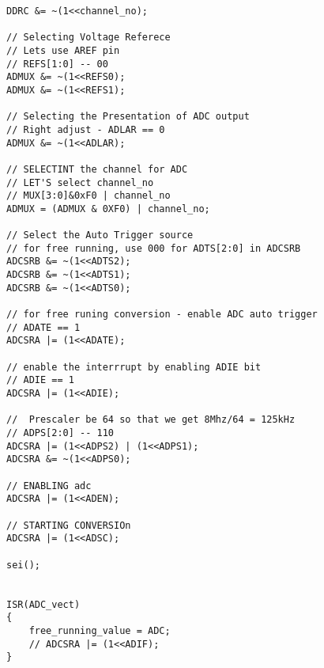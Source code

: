\begin{verbatim}
DDRC &= ~(1<<channel_no);

// Selecting Voltage Referece
// Lets use AREF pin
// REFS[1:0] -- 00
ADMUX &= ~(1<<REFS0);
ADMUX &= ~(1<<REFS1);

// Selecting the Presentation of ADC output
// Right adjust - ADLAR == 0
ADMUX &= ~(1<<ADLAR);

// SELECTINT the channel for ADC
// LET'S select channel_no
// MUX[3:0]&0xF0 | channel_no
ADMUX = (ADMUX & 0XF0) | channel_no;

// Select the Auto Trigger source
// for free running, use 000 for ADTS[2:0] in ADCSRB 
ADCSRB &= ~(1<<ADTS2);
ADCSRB &= ~(1<<ADTS1);
ADCSRB &= ~(1<<ADTS0);

// for free runing conversion - enable ADC auto trigger
// ADATE == 1
ADCSRA |= (1<<ADATE);

// enable the interrrupt by enabling ADIE bit
// ADIE == 1
ADCSRA |= (1<<ADIE);

//  Prescaler be 64 so that we get 8Mhz/64 = 125kHz
// ADPS[2:0] -- 110
ADCSRA |= (1<<ADPS2) | (1<<ADPS1);
ADCSRA &= ~(1<<ADPS0);

// ENABLING adc
ADCSRA |= (1<<ADEN);

// STARTING CONVERSIOn
ADCSRA |= (1<<ADSC);

sei();


ISR(ADC_vect)
{
	free_running_value = ADC;
	// ADCSRA |= (1<<ADIF);
}

\end{verbatim}

% 
